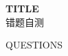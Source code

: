 \documentclass[12pt,a4paper]{article}
\begin{document}
\begin{center}
\LARGE{\textbf{{TITLE}}}\\[0.3cm]
\large{错题自测}
\end{center}
\vspace{0.5cm}
{QUESTIONS}
\end{document}
